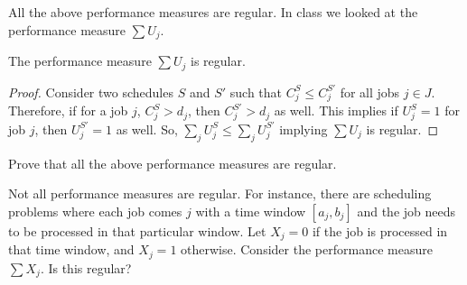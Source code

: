 \documentclass[11pt]{article}
\begin{document}
All the above performance measures are regular. In class we looked at the performance measure $\sum U_j$.

\begin{claim}
The performance measure $\sum U_j$ is regular.
\end{claim}
\begin{proof}
Consider two schedules $S$ and $S'$ such that $C^S_j \le C^{S'}_j$ for all jobs $j\in J$. Therefore, if for a job $j$, $C^S_j > d_j$, then $C^{S'}_j > d_j$ as well. This implies if $U^S_j = 1$ for job $j$, then $U^{S'}_j = 1$ as well. So, $\sum_j U^S_j \le \sum_j U^{S'}_j$ implying 
$\sum U_j$ is regular.
\end{proof}

\begin{exercise}
Prove that all the above performance measures are regular.
\end{exercise}

Not all performance measures are regular. For instance, there are scheduling problems where each job comes $j$ with a time window $[a_j,b_j]$ and the job needs to be processed in that particular window. Let $X_j = 0$ if the job is processed in that time window, and $X_j = 1$ otherwise. Consider the performance measure $\sum X_j$. Is this regular?

\end{document}
